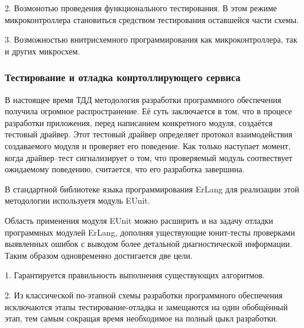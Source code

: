 \begin{par}
	2.	Возмонотью проведения функционального тестирования. В этом режиме микроконтроллера становиться средством тестирования
	оставшейся части схемы.
\end{par}

\begin{par}
	3. Возможностью внитрисхемного программирования как микроконтроллера, так и других микросхем.
\end{par}


\subsubsection{Тестирование и отладка конртоллирующего сервиса}
В настоящее время ТДД методология разработки программного обеспечения получила огромное распространение.
Её суть заключается в том, что в процесе разработки приложения, перед написанием
конкретного модуля, создаётся тестовый драйвер. Этот тестовый драйвер определяет протокол
взаимодействия создаваемого модуля и проверяет его поведение. Как только наступает момент, когда
драйвер--тест сигнализирует о том, что проверяемый модуль соотвествует ожидаемому поведению,
считается, что его разработка завершина.

В стандартной библиотеке языка программирования ErLang для реализации этой методологии используетя модуль EUnit.


Область применения модуля EUnit можно расширить и на задачу отладки программных модулей ErLang,
дополняя уществующие юнит-тесты проверками выявленных ошибок с выводом более детальной диагностической информации.
Таким образом одновременно достигается две цели.
\begin{par}
 	1.	Гарантируется правильность выполнения существующих алгоритмов.
\end{par}
\begin{par}
 	2. Из классической по-этапной схемы разработки программного
		обеспечения исключаются этапы тестирование-отладка и замещаются на один обобщённый этап,
		тем самым сокращая время необходимое на полный цыкл разработки.
\end{par}

